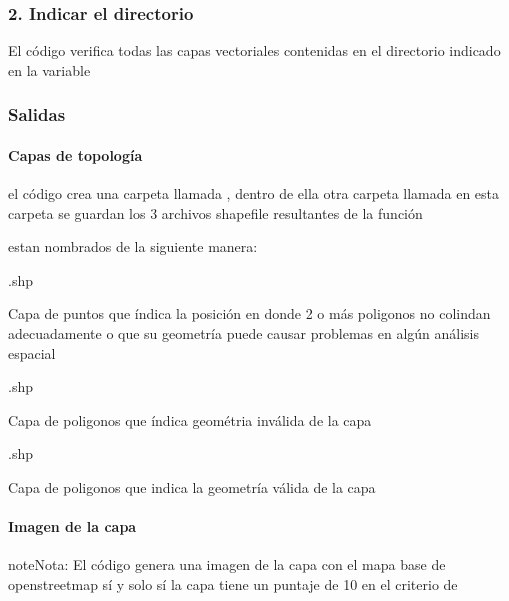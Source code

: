 \documentclass[letterpaper,10pt,spanish]{sphinxmanual}
\begin{document}
\noindent{}


\subsubsection{2. Indicar el directorio}
\label{\detokenize{verificacion:indicar-el-directorio}}
El código verifica todas las capas vectoriales contenidas en el directorio
indicado en la variable 

\begin{sphinxVerbatim}[commandchars=\\\{\}]
  
\end{sphinxVerbatim}


\subsubsection{Salidas}
\label{\detokenize{verificacion:salidas}}

\paragraph{Capas de topología}
\label{\detokenize{verificacion:capas-de-topologia}}
el código crea una carpeta llamada , dentro de ella otra carpeta llamada  en esta
carpeta se guardan los 3 archivos shapefile  resultantes de la función 

estan nombrados de la siguiente manera:

.shp

Capa de puntos que índica la posición en donde 2 o más poligonos no colindan adecuadamente
o que su geometría puede causar problemas en algún análisis espacial

.shp

Capa de poligonos que índica geométria inválida de la capa

.shp

Capa de poligonos que indica la geometría válida de la capa


\paragraph{Imagen de la capa}
\label{\detokenize{verificacion:imagen-de-la-capa}}
\begin{sphinxadmonition}{note}{Nota:}
El código genera una imagen de la capa con el mapa base de openstreetmap
sí y solo sí la capa tiene un puntaje de 10 en el criterio de 
\end{sphinxadmonition}
\end{document}
